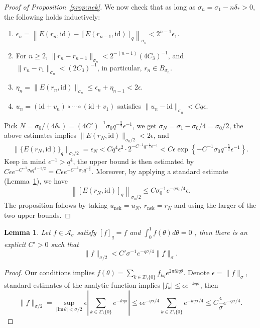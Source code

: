 \documentclass[12pt,reqno]{amsart}
\newtheorem{lem}[thm]{Lemma}
\theoremstyle{remark}
\begin{document}
\begin{proof}[Proof of Proposition~\ref{prop:nek}]
 We now check that as long as $\sigma_n = \sigma_1 - n \delta_* > 0$, the following holds inductively:
\begin{enumerate}
\item $\epsilon_n = \left\| E(r_n, {\mathrm{id}}) - [E(r_{n-1}, {\mathrm{id}})]_q \right\|_{\sigma_n} < 2^{n-1}\epsilon_1$. 
\item For $n \ge 2$, $\|r_n - r_{n-1}\|_{\sigma_n} < 2^{-(n-1)} (4C_3)^{-1}$, and $\|r_n - r_1\|_{\sigma_n} < (2C_3)^{-1}$, in particular, $r_n \in B_{\sigma_n}$.  
\item $\eta_n = \|E(r_n, {\mathrm{id}})\|_{\sigma_n} \le \epsilon_n + \eta_{n-1} < 2 \epsilon$. 
\item $u_n = ({\mathrm{id}} + v_n) \circ \cdots \circ ({\mathrm{id}} + v_1)$ satisfies $\|u_n - {\mathrm{id}}\|_{\sigma_n} < C q\epsilon$. 
\end{enumerate}
Pick $N = \sigma_0/(4\delta_*) = (4C')^{-1} \sigma_0 q^{-\frac52}\epsilon^{-1}$, we get $\sigma_N = \sigma_1 - \sigma_0/4 =\sigma_0/2$,  the above estimates implies $\|E(r_N, {\mathrm{id}})\|_{\sigma_0/2} < 2\epsilon$, and
\[
	  \|\{E(r_N, {\mathrm{id}})\}_q\|_{\sigma_0/2} = \epsilon_N < C  q^4 \epsilon^2 \cdot 2^{- C^{-1} q^{-\frac52} \epsilon^{-1}} < C \epsilon \exp\left\{ - C^{-1} \sigma_0 q^{-\frac52} \epsilon^{-1}  \right\} . 
\]
Keep in mind $\epsilon^{-1} > q^4$, the upper bound is then estimated by $C \epsilon e^{- C^{-1} \sigma_0 q^{4 - 5/2}} = C \epsilon e^{- C^{-1} \sigma_0 q^{-\frac32}}$. Moreover, by applying a standard estimate (Lemma~\ref{lem:res-exp}), we have 
\[
	\left\| [E(r_N, {\mathrm{id}})]_q \right\|_{\sigma_0/2} \le C \sigma_0^{-1} e^{-q\sigma_0/4} \epsilon.  
\]
The proposition follows by taking $u_{{\mathrm{nek}}} = u_N$, $r_{{\mathrm{nek}}} = r_N$ and using the larger of the two upper bounds. 
\end{proof}

\begin{lem}\label{lem:res-exp}
Let $f\in {\mathcal{A}}_{\sigma}$ satisfy  $[f]_q = f$ and $\int_0^1 f(\theta) d\theta = 0$ , then there is an explicit $C' > 0$ such that 
\[
	\|f\|_{\sigma/2} < C' \sigma^{-1} e^{-q\sigma/4} \|f\|_\sigma. 
\]
\end{lem}
\begin{proof}
Our conditions implies $f(\theta) = \sum_{k \in {\mathbb{Z}} \setminus\{0\}} f_{kq} e^{2\pi i k q \theta}$. Denote $\epsilon = \|f\|_\sigma$, standard estimates of the analytic function implies $|f_k| \le \epsilon e^{- k q \sigma}$, then 
\[
	\|f\|_{\sigma/2} = \sup_{|{\mathrm{Im}\,} \theta| < \sigma/2} \epsilon \left|  \sum_{k \in {\mathbb{Z}} \setminus \{0\}} e^{- k q \sigma} \right| \le \epsilon e^{-q\sigma/4} \sum_{k \in {\mathbb{Z}} \setminus \{0\}}  e^{-kq\sigma/4} \le C \frac{\epsilon}{\sigma} e^{-q\sigma/4}. 
\]
 \end{proof}
\end{document}
